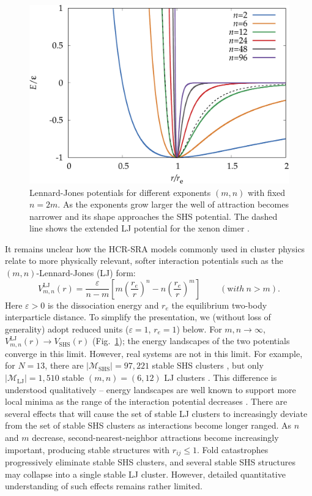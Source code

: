 \begin{figure}\centering
    \includegraphics[width=0.8\columnwidth]{kslj/exampleLJ.pdf}
    \caption{Lennard-Jones potentials for different exponents $(m,n)$ with
    fixed $n=2m$. As the exponents grow larger the well of attraction becomes narrower 
    and its shape approaches the SHS potential. The dashed line
    shows the extended LJ potential for the xenon dimer \autocite{Jerabek_relativisticcoupledclusterinteraction_2017}.}
    \label{fig:LJ}
\end{figure}

It remains unclear how the HCR-SRA models commonly
used in cluster physics relate to more physically relevant, softer interaction potentials such
as the $(m,n)$-Lennard-Jones (LJ) form:
\begin{equation}
V_{m,n}^\mathrm{LJ}(r)=\frac{\varepsilon}{n-m}\left[m\left(\frac{r_e}{r}\right)^{n}-n\left(\frac{r_e}{r}\right)^{m}\right] \ \ \ \ \ \ \ \ \ \  ({\mathrm with}\ n > m).
\label{eqn:nmpot}
\end{equation}
Here $\varepsilon>0$ is the dissociation energy and $r_e$ the equilibrium
two-body interparticle distance. To simplify the presentation,
we (without loss of generality) adopt reduced units ($\varepsilon=1$, $r_e=1$) below.
For $m,n\rightarrow \infty$,
$V_{m,n}^\mathrm{LJ}(r) \rightarrow V_\mathrm{SHS}(r)$ (Fig.~\ref{fig:LJ}); the
energy landscapes of the two potentials converge in this limit.  However, real
systems are not in this limit.  For example, for $N = 13$, there are $|\mathcal{M}_\mathrm{SHS}|=97,221$
stable SHS clusters \autocite{Hoy_Structuredynamicsmodel_2015,Holmes-Cerfon_EnumeratingRigidSphere_2016},
but only $|\mathcal{M}_\mathrm{LJ}|=1,510$ stable $(m,n) = (6,12)$ LJ clusters \autocite{Doye_Evolutionpotentialenergy_1999}.  
This difference is understood qualitatively -- energy landscapes are well known to support more
local minima
as the range of the interaction potential decreases \autocite{braier90,Wales_MicroscopicBasisGlobal_2001}.
There are several effects that will cause the set of
stable LJ clusters to increasingly deviate from the set of stable SHS clusters
as interactions become longer ranged.  As $n$ and $m$ decrease,
second-nearest-neighbor attractions become increasingly important,
producing stable structures with $r_{ij} \leq 1$.  Fold catastrophes
\autocite{Wales_MicroscopicBasisGlobal_2001,wales04} progressively eliminate stable SHS clusters, and several stable SHS
structures may collapse into a single stable LJ cluster.  However,
detailed quantitative understanding of such effects remains rather limited.

